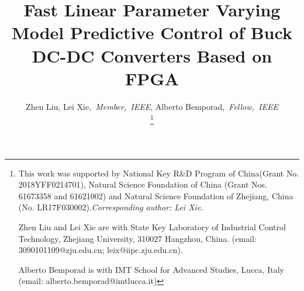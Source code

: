 \documentclass[journal]{IEEEtran}
\begin{document}
%
\title{Fast Linear Parameter Varying Model Predictive Control of Buck DC-DC Converters Based on FPGA}
%
%
%

\author{Zhen Liu, Lei Xie,\emph{~Member,~IEEE}, Alberto Bemporad,\emph{~Fellow,~IEEE}%

\thanks{
This work was supported by National Key R\&D Program of
China(Grant No. 2018YFF0214701), Natural Science Foundation of China
(Grant Nos. 61673358 and 61621002) and Natural Science Foundation of
Zhejiang, China (No. LR17F030002).\emph{Corresponding author: Lei Xie.}
	
Zhen Liu and Lei Xie are with State Key Laboratory of Industrial Control Technology, Zhejiang University, 310027 Hangzhou, China. (email: 3090101109@zju.edu.cn; leix@iipc.zju.edu.cn). 

Alberto Bemporad is with IMT School for Advanced Studies, Lucca, Italy (email: alberto.bemporad@imtlucca.it)}%

}

%
%
\end{document}
